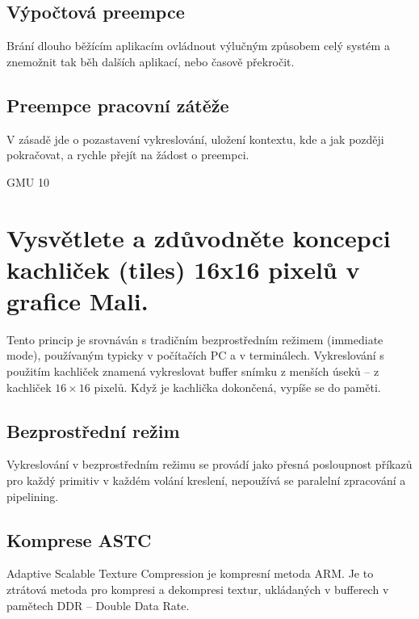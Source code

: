 	\subsection*{Výpočtová preempce}
		Brání dlouho běžícím aplikacím ovládnout výlučným způsobem celý systém a znemožnit tak běh dalších aplikací, nebo časově překročit.
	
	\subsection*{Preempce pracovní zátěže}
		V zásadě jde o pozastavení vykreslování, uložení kontextu, kde a jak později pokračovat, a rychle přejít na žádost o preempci.

	
	
	
	
	GMU 10
	
	
	
	
\section{Vysvětlete a zdůvodněte koncepci kachliček (tiles) 16x16 pixelů v grafice Mali.}
	Tento princip je srovnáván s tradičním bezprostředním režimem (immediate mode), používaným typicky v počítačích PC a v terminálech.
	Vykreslování s použitím kachliček znamená vykreslovat buffer snímku z menších úseků -- z kachliček $16 \times 16$ pixelů. Když je kachlička dokončená, vypíše se do paměti.
	
	\subsection*{Bezprostřední režim}
		Vykreslování v bezprostředním režimu se provádí jako přesná posloupnost příkazů pro každý primitiv v každém volání kreslení, nepoužívá se paralelní zpracování a pipelining.
	
	
	
	
	\subsection*{Komprese ASTC}
		Adaptive Scalable Texture Compression je kompresní metoda ARM. Je to ztrátová metoda pro kompresi a dekompresi textur, ukládaných v bufferech v pamětech DDR – Double Data Rate.
		
